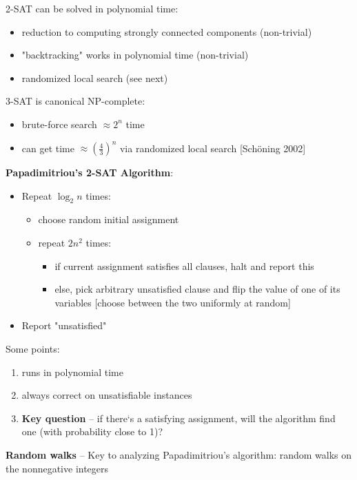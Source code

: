 \documentclass[a4paper,12pt]{article}
\theoremstyle{plain}
\theoremstyle{definition}
\theoremstyle{remark}
\begin{document}
2-SAT can be solved in polynomial time:
\begin{itemize}
	\item reduction to computing strongly connected components (non-trivial)
	\item "backtracking" works in polynomial time (non-trivial)
	\item randomized local search (see next)\\
\end{itemize}

3-SAT is canonical NP-complete:
\begin{itemize}
	\item brute-force search $\approx 2^n$ time
	\item can get time $\approx (\frac{4}{3})^n$ via randomized local search [Sch{\"o}ning 2002]\\
\end{itemize}

\textbf{Papadimitriou's 2-SAT Algorithm}:
\begin{itemize}
	\item Repeat $\log_2 n$ times:
	\begin{itemize}
		\item choose random initial assignment
		\item repeat $2n^2$ times:
		\begin{itemize}
			\item if current assignment satisfies all clauses, halt and report this
			\item else, pick arbitrary unsatisfied clause and flip the value of one of its variables [choose between the two uniformly at random]
		\end{itemize}
	\end{itemize}
	\item Report "unsatisfied"\\
\end{itemize}

Some points:
\begin{enumerate}
	\item runs in polynomial time
	\item always correct on unsatisfiable instances
	\item \textbf{Key question} -- if there`s a satisfying assignment, will the algorithm find one (with probability close to 1)?\\
\end{enumerate}

\textbf{Random walks} -- Key to analyzing Papadimitriou's algorithm: random walks on the nonnegative integers
\end{document}
